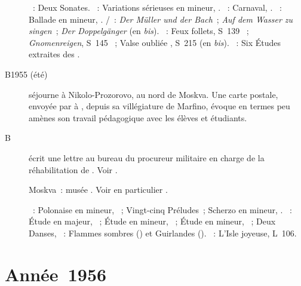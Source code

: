 \begin{description}
 \textsc{\Scarlatti{}}~: Deux Sonates.
 \textsc{\Mendelssohn{}}~: Variations sérieuses en \kD mineur, .
 \textsc{\Schumann{}}~: Carnaval, .
 \textsc{\Chopin{}}~: Ballade en \kG mineur, .
 \textsc{\Schubert{}/\Liszt{}}~: \emph{Der Müller und der Bach}~; \emph{Auf
 dem Wasser zu singen}~; \emph{Der Doppelgänger} (en \emph{bis}).
 \textsc{\Liszt{}}~: Feux follets, S~139 ~; \emph{Gnomenreigen},
 S~145 ~; Valse oubliée , S~215  (en
 \emph{bis}).
 \textsc{\Scriabine{}}~: Six Études extraites des .
 \item[B1955 (été)]
 \VSofronitsky{} séjourne à Nikolo-Prozorovo, au nord de Moskva.
 Une carte postale, envoyée par \Sofronitsky{} à \citet[p.~398]{Shiryaeva},
 depuis sa villégiature de Marfino, évoque en termes peu amènes son travail
 pédagogique avec les élèves et étudiants.
 \item[B\DateWithWeekDay{1955-08-31}]
 \VSofronitsky{} écrit une lettre au bureau du procureur militaire en charge
 de la réhabilitation de \VMeyerhold{}.
 Voir \citet[p.~367]{NikonovichScriabine08}.
 \item[\DateWithWeekDay{1955-10-02}]
 Moskva~: musée \Scriabine{}.
 Voir en particulier \citet[p.~449]{Milshteyn82a}.

 \textsc{\Chopin{}}~: Polonaise en \kC \Sharp mineur,  ~;
 Vingt-cinq Préludes~; Scherzo en \kB mineur, .
 \textsc{\Scriabine{}}~: Étude en \kB majeur,  ~; Étude en
 \kB \Flat mineur,  ~; Étude en \kB \Flat mineur, 
 ~; Deux Danses, ~: Flammes sombres () et
 Guirlandes ().
 \textsc{\Debussy{}}~: L'\hbox{Isle} joyeuse, L~106.
\end{description}

\section{Année~1956}

